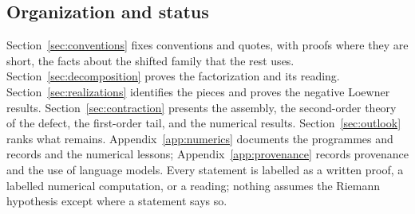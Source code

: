 \subsection{Organization and status}

Section~\ref{sec:conventions} fixes conventions and quotes, with proofs where
they are short, the facts about the shifted family that the rest uses.
Section~\ref{sec:decomposition} proves the factorization and its reading.
Section~\ref{sec:realizations} identifies the pieces and proves the negative
Loewner results. Section~\ref{sec:contraction} presents the assembly, the
second-order theory of the defect, the first-order tail, and the numerical
results. Section~\ref{sec:outlook} ranks what remains. Appendix~\ref{app:numerics}
documents the programmes and records and the numerical lessons;
Appendix~\ref{app:provenance} records provenance and the use of language
models. Every statement is labelled as a written proof, a labelled numerical
computation, or a reading; nothing assumes the Riemann hypothesis except where
a statement says so.
